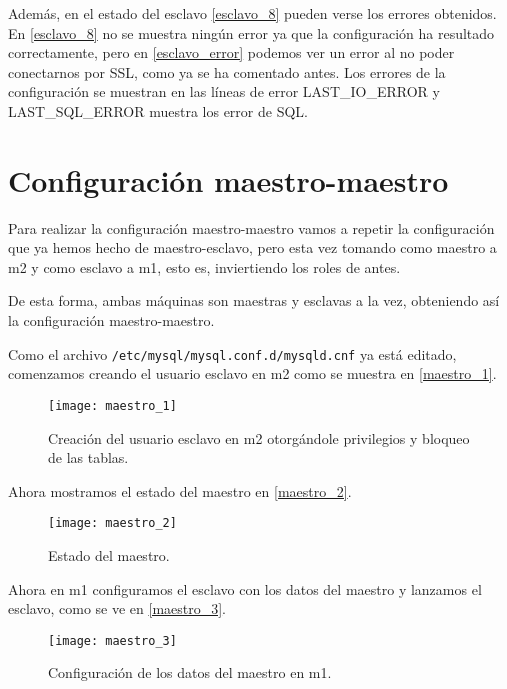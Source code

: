 Además, en el estado del esclavo \eqref{esclavo_8} pueden verse los errores obtenidos. En \eqref{esclavo_8} no se muestra ningún error ya que la configuración ha resultado correctamente, pero en \eqref{esclavo_error} podemos ver un error al no poder conectarnos por SSL, como ya se ha comentado antes. Los errores de la configuración se muestran en las líneas de error LAST\_IO\_ERROR y LAST\_SQL\_ERROR muestra los error de SQL.

\chapter{Configuración maestro-maestro}

Para realizar la configuración maestro-maestro vamos a repetir la configuración que ya hemos hecho de maestro-esclavo, pero esta vez tomando como maestro a m2 y como esclavo a m1, esto es, inviertiendo los roles de antes.

De esta forma, ambas máquinas son maestras y esclavas a la vez, obteniendo así la configuración maestro-maestro.

Como el archivo \verb|/etc/mysql/mysql.conf.d/mysqld.cnf| ya está editado, comenzamos creando el usuario esclavo en m2 como se muestra en \eqref{maestro_1}.

\begin{figure}[h!]
\begin{center}
\caption{Creación del usuario esclavo en m2 otorgándole privilegios y bloqueo de las tablas.}
\label{maestro_1}
\texttt{[image: maestro\_1]}
\end{center}
\end{figure}

Ahora mostramos el estado del maestro en \eqref{maestro_2}.

\begin{figure}[h!]
\begin{center}
\caption{Estado del maestro.}
\label{maestro_2}
\texttt{[image: maestro\_2]}
\end{center}
\end{figure}

Ahora en m1 configuramos el esclavo con los datos del maestro y lanzamos el esclavo, como se ve en \eqref{maestro_3}.

\begin{figure}[h!]
\begin{center}
\caption{Configuración de los datos del maestro en m1.}
\label{maestro_3}
\texttt{[image: maestro\_3]}
\end{center}
\end{figure}

